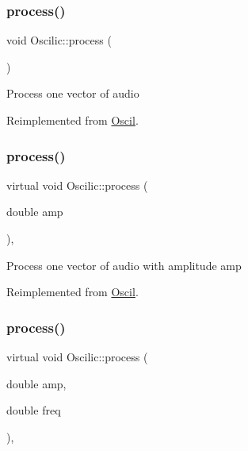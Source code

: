 \subsubsection{\texorpdfstring{process()}{process()}\hspace{0.1cm}{\footnotesize\ttfamily [1/3]}}
{\footnotesize\ttfamily void Oscilic\+::process (\begin{DoxyParamCaption}{ }\end{DoxyParamCaption})\hspace{0.3cm}{\ttfamily [virtual]}}

Process one vector of audio 

Reimplemented from \hyperlink{class_oscil_a0e658a6f1b494286a783ce63e95f48ba}{Oscil}.

\mbox{\label{class_oscilic_ad97eaf877abdd40fc06499198eb3d9bc}} 
\subsubsection{\texorpdfstring{process()}{process()}\hspace{0.1cm}{\footnotesize\ttfamily [2/3]}}
{\footnotesize\ttfamily virtual void Oscilic\+::process (\begin{DoxyParamCaption}\item[{double}]{amp }\end{DoxyParamCaption})\hspace{0.3cm}{\ttfamily [inline]}, {\ttfamily [virtual]}}

Process one vector of audio with amplitude amp 

Reimplemented from \hyperlink{class_oscil_a7ed04cfd228e849ddf95d09ea0aee8c2}{Oscil}.

\mbox{\label{class_oscilic_acce96320f114bbd74114ef87e39660aa}} 
\subsubsection{\texorpdfstring{process()}{process()}\hspace{0.1cm}{\footnotesize\ttfamily [3/3]}}
{\footnotesize\ttfamily virtual void Oscilic\+::process (\begin{DoxyParamCaption}\item[{double}]{amp,  }\item[{double}]{freq }\end{DoxyParamCaption})\hspace{0.3cm}{\ttfamily [inline]}, {\ttfamily [virtual]}}

